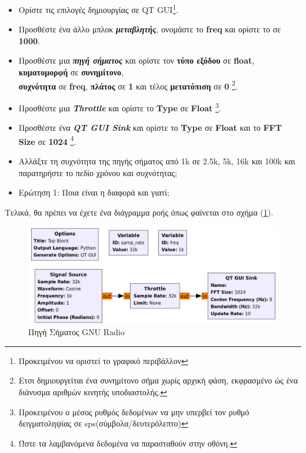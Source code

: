 \documentclass[12pt]{report}
\begin{document}
\begin{itemize}
\begin{itemize}
{                        })
                    \end{itemize}
                \item Ορίστε τις επιλογές δημιουργίας σε QT GUI\footnote{Προκειμένου να οριστεί το γραφικό περιβάλλον}.
                \item Προσθέστε ένα άλλο μπλοκ \textbf{\textit{μεταβλητής}}, 
                    ονομάστε το \textbf{freq} και ορίστε το σε \textbf{1000}.
                \item Προσθέστε μια \textbf{\textit{πηγή σήματος}} και ορίστε τον \textbf{τύπο εξόδου}
                σε \textbf{float}, \textbf{κυματομορφή} σε \textbf{συνημίτονο},\\
                \textbf{συχνότητα} σε \textbf{freq}, \textbf{πλάτος} σε \textbf{1} και τέλος 
                \textbf{μετατόπιση} σε \textbf{0} \footnote{
                    Ετσι δημιουργείται ένα συνημίτονο σήμα χωρίς αρχική φάση, εκφρασμένο ώς ένα διάνυσμα 
                    αριθμών κινητής υποδιαστολής.
                }.
                \item Προσθέστε μια \textbf{\textit{Throttle}} και ορίστε το \textbf{Type} σε \textbf{Float} 
                \footnote{Προκειμένου ο μέσος ρυθμός δεδομένων να μην υπερβεί τον ρυθμό δειγματοληψίας σε 
                sps(σύμβολα/δευτερόλεπτο)}.
                \item Προσθέστε ένα \textbf{\textit{QT GUI Sink}} και ορίστε το \textbf{Type} σε \textbf{Float}
                και το \textbf{FFT Size} σε \textbf{1024} \footnote{Ώστε τα λαμβανόμενα δεδομένα να παρασταθούν
                    στην οθόνη.
                }.
                \item Αλλάξτε τη συχνότητα της πηγής σήματος από 1k σε 2.5k, 5k, 16k και 100k 
                και παρατηρήστε το πεδίο χρόνου και συχνότητας;
                \item \textsf{Ερώτηση 1: Ποια είναι η διαφορά και γιατί;}
            \end{itemize}

            Τελικά, θα πρέπει να έχετε ένα διάγραμμα ροής όπως φαίνεται στο σχήμα (\ref{fig:grcSource}).
            \begin{figure}[ht]
                \centering
                \includegraphics[width=.8\textwidth]{ex1_flow.png}
                \caption{Πηγή Σήματος GNU Radio}
                \label{fig:grcSource}
            \end{figure}
\end{document}
